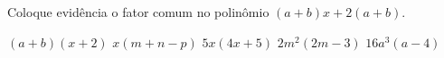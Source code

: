 Coloque evidência o fator comum no polinômio $(a+b)x+2(a+b)$.

$(a+b)(x+2)$
$x(m+n-p)$
$5x(4x+5)$
$2m^2(2m-3)$
$16a^3(a-4)$


